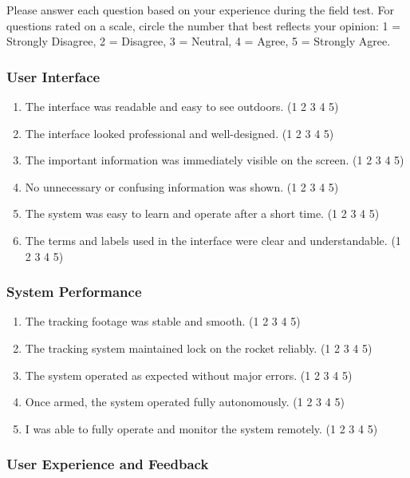 \documentclass[12pt, titlepage]{article}
\begin{document}
Please answer each question based on your experience during the field test. For
questions rated on a scale, circle the number that best reflects your opinion:
1 = Strongly Disagree, 2 = Disagree, 3 = Neutral, 4 = Agree, 5 = Strongly
Agree.

\subsubsection*{User Interface}

\begin{enumerate}
  \item The interface was readable and easy to see outdoors. \hfill (1 2 3 4 5)
  \item The interface looked professional and well-designed. \hfill (1 2 3 4 5)
  \item The important information was immediately visible on the screen. \hfill (1 2 3
        4 5)
  \item No unnecessary or confusing information was shown. \hfill (1 2 3 4 5)
  \item The system was easy to learn and operate after a short time. \hfill (1 2 3 4 5)
  \item The terms and labels used in the interface were clear and understandable.
        \hfill (1 2 3 4 5)
\end{enumerate}

\subsubsection*{System Performance}

\begin{enumerate}
  \item The tracking footage was stable and smooth. \hfill (1 2 3 4 5)
  \item The tracking system maintained lock on the rocket reliably. \hfill (1 2 3 4 5)
  \item The system operated as expected without major errors. \hfill (1 2 3 4 5)
  \item Once armed, the system operated fully autonomously. \hfill (1 2 3 4 5)
  \item I was able to fully operate and monitor the system remotely. \hfill (1 2 3 4 5)
\end{enumerate}

\subsubsection*{User Experience and Feedback}
\end{document}
